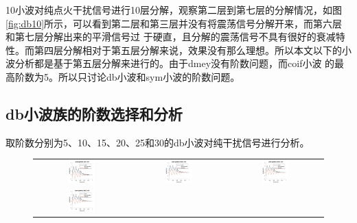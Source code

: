 10小波对纯点火干扰信号进行10层分解，观察第二层到第七层的分解情况，如图\ref{fig:db10}所示，可以看到第二层和第三层并没有将震荡信号分解开来，而第六层和第七层分解出来的平滑信号过
于硬直，且分解的震荡信号不具有很好的衰减特性。而第四层分解相对于第五层分解来说，效果没有那么理想。所以本文以下的小波分析都是基于第五层分解来进行的。由于dmey没有阶数问题，而coif小波
的最高阶数为5。所以只讨论db小波和sym小波的阶数问题。
\subsection{db小波族的阶数选择和分析}
取阶数分别为5、10、15、20、25和30的db小波对纯干扰信号进行分析。
\begin{figure}[!htb]
	\centering
	\begin{tabular}{ccc}
		\includegraphics[width=0.3\textwidth]{thesis_figure/ion_chapter/db5_lvl5}&
		\includegraphics[width=0.3\textwidth]{thesis_figure/ion_chapter/db10_lvl5_1}&
		\includegraphics[width=0.3\textwidth]{thesis_figure/ion_chapter/db15_lvl5}\\
		\includegraphics[width=0.3\textwidth]{thesis_figure/ion_chapter/db20_lvl5}&

\end{tabular}
\end{figure}
